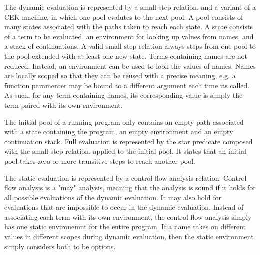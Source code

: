 \documentclass[letterpaper, 11pt]{extarticle}
\begin{document}
The dynamic evaluation is represented by a small step relation, and a variant of a CEK machine, in which one pool evalutes
to the next pool. A pool consists of many states associated with the paths taken to reach each state. A state consists
of a term to be evaluated, an environment for looking up values from names, and a stack of continuations.
A valid small step relation always steps from one pool to the pool extended with at least one new state.
Terms containing names are not reduced. Instead, an environment can be used to look the values of names.
Names are locally scoped so that they can be reused with a precise meaning, e.g. a function paramenter may be bound to
a different argument each time its called. As such, for any term containing names, its corresponding value is simply
the term paired with its own environment.

The initial pool of a running program only contains an empty path associated with a state containing the program,
an empty environment and an empty continuation stack.
Full evaluation is represented by the star predicate composed with the small step relation, applied to the initial pool.
It states that an initial pool takes zero or more transitive steps to reach another pool.

The static evaluation is represented by a control flow analysis relation. Control flow analysis is a "may" analysis,
meaning that the analysis is sound if it holds for all possible evaluations of the dynamic evaluation.
It may also hold for evaluations that are impossible to occur in the dynamic evaluation.
Instead of associating each term with its own environment, the control flow analysis simply has one static environemnt
for the entire program. If a name takes on different values in different scopes during dynamic evaluation, then
the static environment simply considers both to be options. 
\end{document}
